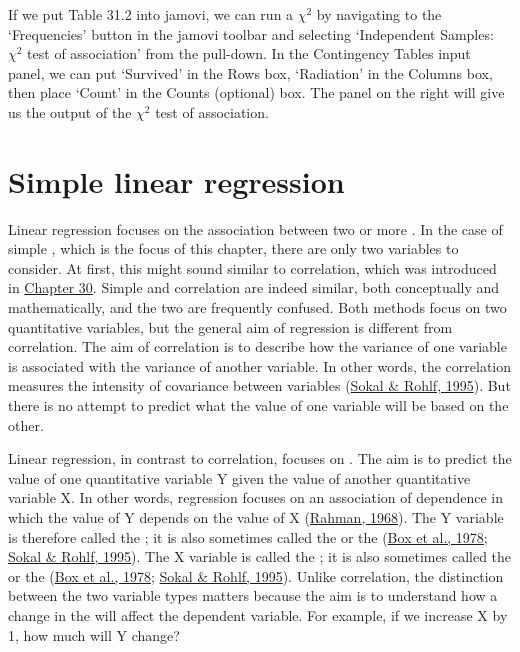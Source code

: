 \documentclass[
  openany]{krantz}
\begin{document}
If we put Table 31.2 into jamovi, we can run a \(\chi^{2}\)  by navigating to the `Frequencies' button in the jamovi toolbar and selecting `Independent Samples: \(\chi^{2}\) test of association' from the pull-down.
In the Contingency Tables input panel, we can put `Survived' in the Rows box, `Radiation' in the Columns box, then place `Count' in the Counts (optional) box.
The panel on the right will give us the output of the \(\chi^{2}\) test of association.

\hypertarget{Chapter_32}{%
\chapter{Simple linear regression}\label{Chapter_32}}

Linear regression focuses on the association between two or more .
In the case of simple , which is the focus of this chapter, there are only two variables to consider.
At first, this might sound similar to correlation, which was introduced in \protect\hyperlink{Chapter_30}{Chapter 30}.
Simple  and correlation are indeed similar, both conceptually and mathematically, and the two are frequently confused.
Both methods focus on two quantitative variables, but the general aim of regression is different from correlation.
The aim of correlation is to describe how the variance of one variable is associated with the variance of another variable.
In other words, the correlation measures the intensity of covariance between variables (\protect\hyperlink{ref-Sokal1995}{Sokal \& Rohlf, 1995}).
But there is no attempt to predict what the value of one variable will be based on the other.

Linear regression, in contrast to correlation, focuses on .
The aim is to predict the value of one quantitative variable Y given the value of another quantitative variable X.
In other words, regression focuses on an association of dependence in which the value of Y depends on the value of X (\protect\hyperlink{ref-Rahman1968}{Rahman, 1968}).
The Y variable is therefore called the \textbf{}; it is also sometimes called the  or the  (\protect\hyperlink{ref-Box1978}{Box et al., 1978}; \protect\hyperlink{ref-Sokal1995}{Sokal \& Rohlf, 1995}).
The X variable is called the \textbf{}; it is also sometimes called the  or the  (\protect\hyperlink{ref-Box1978}{Box et al., 1978}; \protect\hyperlink{ref-Sokal1995}{Sokal \& Rohlf, 1995}).
Unlike correlation, the distinction between the two variable types matters because the aim is to understand how a change in the  will affect the dependent variable.
For example, if we increase X by 1, how much will Y change?
\end{document}
